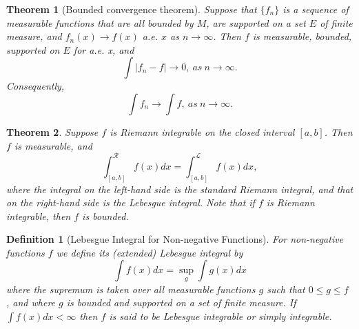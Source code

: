 \documentclass{report}
\theoremstyle{upthm}
\newtheorem{thm}{Theorem}
\newtheorem{defn}{Definition}
\newcommand{\calL}{{\mathcal{L}}}
\newcommand{\calR}{{\mathcal{R}}}
\newcommand{\set}[1]{\big\lbrace #1 \big\rbrace}
\begin{document}
\begin{thm}[Bounded convergence theorem]
Suppose that $\set{f_n}$ is a sequence of measurable functions that are all bounded by $M$, are supported on a set $E$ of finite measure, and $f_n(x) \rightarrow f(x)$ a.e. $x$ as $n \rightarrow \infty$. Then $f$ is measurable, bounded, supported on $E$ for a.e. x, and
$$ \int |f_n - f| \rightarrow 0,\ as\ n\rightarrow \infty. $$
Consequently,
$$ \int f_n \rightarrow \int f,\ as\ n \rightarrow \infty. $$	
\end{thm}

\begin{thm}
	Suppose $f$ is Riemann integrable on the closed interval $[a, b]$. Then $f$ is measurable, and 
	$$ \int_{[a, b]}^\calR f(x) dx  = \int_{[a, b]}^\calL f(x) dx ,$$
	where the integral on the left-hand side is the standard Riemann integral, and that on the right-hand side is the Lebesgue integral. Note that if $f$ is Riemann integrable, then $f$ is bounded.
\end{thm}

\begin{defn}[Lebesgue Integral for Non-negative Functions]
	For non-negative functions $f$ we define its (extended) Lebesgue integral by
	$$\int f(x) dx = \sup_{g} \int g(x) dx$$
	where the supremum is taken over all measurable functions $g$ such that	$0 \leq g \leq f$ , and where $g$ is bounded and supported on a set of finite measure. If $\int f(x) dx < \infty$ then $f$ is said to be Lebesgue integrable or simply integrable.
\end{defn}
\end{document}
